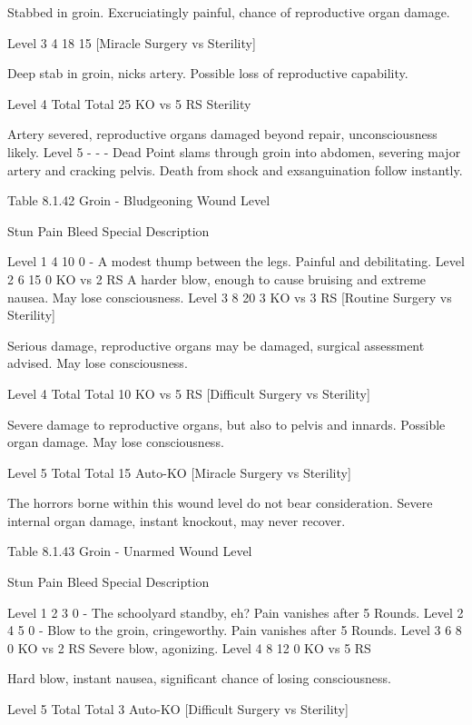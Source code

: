 \documentclass[oneside,11pt,english]{book}
\begin{document}
Stabbed in groin. Excruciatingly painful, chance of 
reproductive organ damage. 

Level 3 4 18 15 [Miracle 
Surgery vs 
Sterility] 

Deep stab in groin, nicks artery. Possible loss of 
reproductive capability. 

Level 4 Total Total 25 KO vs 5 RS 
Sterility 

Artery severed, reproductive organs damaged beyond repair, 
unconsciousness likely. 
Level 5 - - - Dead Point slams through groin into abdomen, severing major 
artery and cracking pelvis. Death from shock and 
exsanguination follow instantly. 

 

 


Table 8.1.42 Groin - Bludgeoning 
Wound 
Level 

Stun Pain Bleed Special Description 

Level 1 4 10 0 - A modest thump between the legs. Painful and debilitating. 
Level 2 6 15 0 KO vs 2 RS A harder blow, enough to cause bruising and extreme 
nausea. May lose consciousness. 
Level 3 8 20 3 KO vs 3 RS 
[Routine 
Surgery vs 
Sterility] 

Serious damage, reproductive organs may be damaged, 
surgical assessment advised. May lose consciousness. 

Level 4 Total Total 10 KO vs 5 RS 
[Difficult 
Surgery vs 
Sterility] 

Severe damage to reproductive organs, but also to pelvis 
and innards. Possible organ damage. May lose 
consciousness. 

Level 5 Total Total 15 Auto-KO 
[Miracle Surgery 
vs Sterility] 

The horrors borne within this wound level do not bear 
consideration. Severe internal organ damage, instant 
knockout, may never recover. 

 
Table 8.1.43 Groin - Unarmed 
Wound 
Level 

Stun Pain Bleed Special Description 

Level 1 2 3 0 - The schoolyard standby, eh? Pain vanishes after 5 
Rounds. 
Level 2 4 5 0 - Blow to the groin, cringeworthy. Pain vanishes 
after 5 Rounds. 
Level 3 6 8 0 KO vs 2 RS Severe blow, agonizing. 
Level 4 8 12 0 KO vs 5 RS 

 

Hard blow, instant nausea, significant chance of 
losing consciousness. 

Level 5 Total Total 3 Auto-KO 
[Difficult Surgery vs 
Sterility] 
\end{document}
